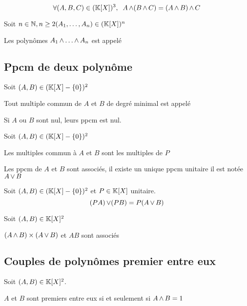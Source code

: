 \begin{prp}
\[
    \forall (A, B, C) \in (\mathbb{K}[X])^3, \;\;
    A \operatorname{\wedge} (B \operatorname{\wedge} C) = (A \operatorname{\wedge} B) \operatorname{\wedge} C
\]
\end{prp}

\begin{dfn}
Soit $n \in \mathbb{N}, n \geq 2 (A_1, \ldots, A_n) \in (\mathbb{K}[X])^n$

Les polynômes $A_1 \operatorname{\wedge} \ldots \operatorname{\wedge} A_n$ est appelé
\end{dfn}

\subsection{Ppcm de deux polynôme}

\begin{dfn}
  Soit $(A, B) \in (\mathbb{K}[X] - \{0\})^2$

  Tout multiple commun de $A$ et $B$ de degré minimal
  est appelé 

  Si $A$ ou $B$ sont nul, leurs ppcm est nul.
\end{dfn}

\begin{prp}
  Soit $(A, B) \in (\mathbb{K}[X] - \{0\})^2$

  Les multiples commun à $A$ et $B$ sont les multiples de $P$

  Les ppcm de $A$ et $B$ sont associés, il existe un unique
  ppcm unitaire il est notée $A \operatorname{\vee} B$
\end{prp}

\begin{prp}
  Soit $(A, B) \in (\mathbb{K}[X] - \{0\})^2$ et $P \in \mathbb{K}[X]$
  unitaire.
  \[
    (P A) \operatorname{\vee} (P B) = P (A \operatorname{\vee} B)
  \]
\end{prp}

\begin{prp}
  Soit $(A, B) \in \mathbb{K}[X]^2$
  
  $(A \operatorname{\wedge} B) \times (A \operatorname{\vee} B)$ et $A B$ sont associés
\end{prp}

\subsection{Couples de polynômes premier entre eux}

\begin{dfn}
  Soit $(A, B) \in \mathbb{K}[X]^2$.

  $A$ et $B$ sont premiers entre eux si et seulement si $A \operatorname{\wedge} B = 1$
\end{dfn}

